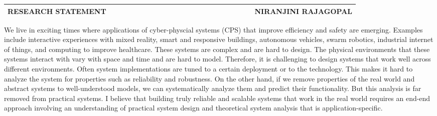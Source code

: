 \documentclass[10pt]{article}
\date{}
\begin{document}

\begin{table}
\color{magenta}
\begin{tabular*}{\textwidth}{l r}
\large\textbf{RESEARCH STATEMENT} & 
\hfill \ \ \ \ \ \ \ \ \ \ \ \ \ \ \ \ \ \ \ \
\ \ \ \ \ \ \ \ \ \ \ \ \ \ \ 
\large\textbf{NIRANJINI RAJAGOPAL}\\
\hline
\end{tabular*}

\end{table}





We live in exciting times where applications of cyber-physcial systems
(CPS) that improve efficiency and safety are emerging. Examples
include interactive experiences with mixed reality, smart and
responsive buildings, autonomous vehicles, swarm robotics, industrial
internet of things, and computing to improve healthcare. These systems
are complex and are hard to design. The physical environments that
these systems interact with vary with space and time and are hard to
model. Therefore, it is challenging to design systems that work well
across different environments. Often system implementations are tuned
to a certain deployment or to the technology. This makes it hard to
analyze the system for properties such as reliability and
robustness. On the other hand, if we remove properties of the real
world and abstract systems to well-understood models, we can
systematically analyze them and predict their functionality. But this
analysis is far removed from practical systems. I believe that
building truly reliable and scalable systems that work in the real
world requires an end-end approach involving an understanding of
practical system design and theoretical system analysis that is
application-specific.
\end{document}
